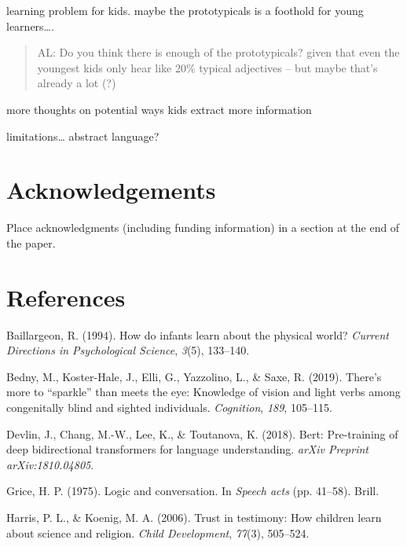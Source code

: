 \documentclass[10pt, letterpaper]{article}
\begin{document}
learning problem for kids. maybe the prototypicals is a foothold for
young learners\ldots{}.

\begin{quote}
AL: Do you think there is enough of the prototypicals? given that even
the youngest kids only hear like 20\% typical adjectives -- but maybe
that's already a lot (?)
\end{quote}

more thoughts on potential ways kids extract more information

limitations\ldots{} abstract language?

\hypertarget{acknowledgements}{%
\section{Acknowledgements}\label{acknowledgements}}

Place acknowledgments (including funding information) in a section at
the end of the paper.

\hypertarget{references}{%
\section{References}\label{references}}

\setlength{\parindent}{-0.1in} 
\setlength{\leftskip}{0.125in}

\noindent

\hypertarget{refs}{}
\leavevmode\hypertarget{ref-baillargeon1994}{}%
Baillargeon, R. (1994). How do infants learn about the physical world?
\emph{Current Directions in Psychological Science}, \emph{3}(5),
133--140.

\leavevmode\hypertarget{ref-bedny2019}{}%
Bedny, M., Koster-Hale, J., Elli, G., Yazzolino, L., \& Saxe, R. (2019).
There's more to ``sparkle'' than meets the eye: Knowledge of vision and
light verbs among congenitally blind and sighted individuals.
\emph{Cognition}, \emph{189}, 105--115.

\leavevmode\hypertarget{ref-devlin2018}{}%
Devlin, J., Chang, M.-W., Lee, K., \& Toutanova, K. (2018). Bert:
Pre-training of deep bidirectional transformers for language
understanding. \emph{arXiv Preprint arXiv:1810.04805}.

\leavevmode\hypertarget{ref-grice1975}{}%
Grice, H. P. (1975). Logic and conversation. In \emph{Speech acts} (pp.
41--58). Brill.

\leavevmode\hypertarget{ref-harris2006}{}%
Harris, P. L., \& Koenig, M. A. (2006). Trust in testimony: How children
learn about science and religion. \emph{Child Development},
\emph{77}(3), 505--524.
\end{document}
